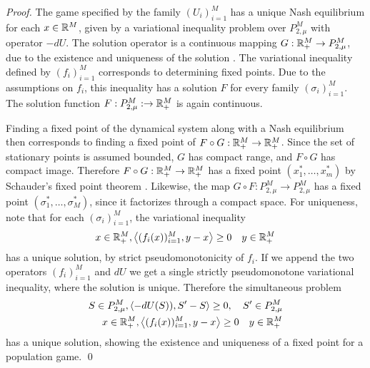 \begin{proof}
  The game specified by the family $(U_i)_{i=1}^M$ has a unique Nash equilibrium for each $x\in \mathbb{R}^M$, given by a variational inequality problem over $P_{2,\mu}^M$ with operator $-dU$. The solution operator is a continuous mapping $G: \mathbb{R}_+^M \to P_{2,\mu}^M$, due to the existence and uniqueness of the solution  \cite[Theorem 4.2]{barbagallo2009continuity}. The variational inequality defined by $(f_i)_{i=1}^M$ corresponds to determining fixed points. Due to the assumptions on $f_i$, this inequality has a solution $F$ for every family $(\sigma_i)_{i=1}^M$. The solution function $F:P_{2,\mu}^M: \to \mathbb{R}^M_+$ is again continuous.

  Finding a fixed point of the dynamical system along with a Nash equilibrium then corresponds to finding a fixed point of $F\circ G: \mathbb{R}_+^M \to \mathbb{R}_+^M$. Since the set of stationary points is assumed bounded, $G$ has compact range, and $F\circ G$ has compact image. Therefore $F\circ G:\mathbb{R}_+^M \to \mathbb{R}_+^M$ has a fixed point $(x_1^*, \dots, x_m^*)$ by Schauder's fixed point theorem \citep[Theorem 3.2, p. 119]{granas2003elementary}. Likewise, the map $G\circ F:P_{2,\mu}^M \to P_{2,\mu}^M$ has a fixed point $(\sigma_1^*,\dots, \sigma_M^*)$, since it factorizes through a compact space.
  For uniqueness, note that for each $(\sigma_i)_{i=1}^M$, the variational inequality
  \begin{equation}
    x \in \mathbb{R}_+^M, \left \langle (f_i(x))_{i=1}^M,y-x \right \rangle\geq 0 \quad y\in \mathbb{R}_+^M
  \end{equation}
  has a unique solution, by strict pseudomonotonicity of $f_i$. If we append the two operators $(f_i)_{i=1}^M$ and $dU$ we get a single strictly pseudomonotone variational inequality, where the solution is unique.
   Therefore the simultaneous problem
  \begin{equation}
    \begin{split}
    S\in P_{2,\mu}^M, \left \langle -dU(S)),S'-S \right \rangle \geq 0, \quad S' \in P_{2,\mu}^M \\
    x \in \mathbb{R}_+^M, \left \langle (f_i(x))_{i=1}^M,y-x \right \rangle\geq 0 \quad y\in \mathbb{R}_+^M
  \end{split}
  \end{equation}
    has a unique solution, showing the existence and uniqueness of a fixed point for a population game.
    \qed
\end{proof}

